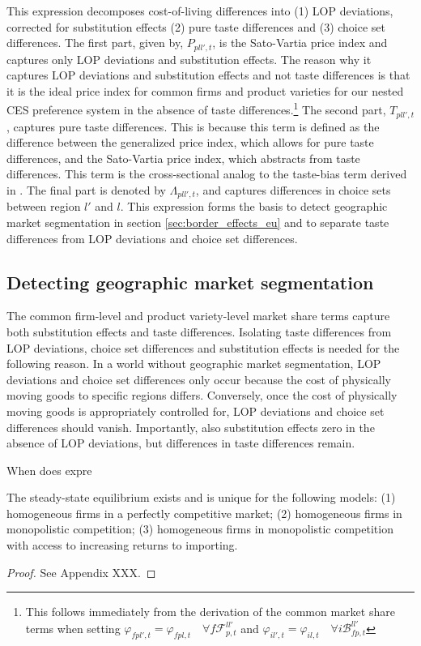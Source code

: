 This expression decomposes cost-of-living differences into (1) LOP deviations, corrected for substitution effects (2) pure taste differences and (3) choice set differences. The first part, given by, $P_{pll',t}$, is the Sato-Vartia price index and captures only LOP deviations and substitution effects. The reason why it captures LOP deviations and substitution effects and not taste differences is that it is the ideal price index for common firms and product varieties for our nested CES preference system in the absence of taste differences.\footnote{This follows immediately from the derivation of the common market share terms when setting $\varphi_{fpl',t} = \varphi_{fpl,t} \quad \forall f \mathcal{F}^{ll'}_{p,t}$ and $\varphi_{il',t} = \varphi_{il,t} \quad \forall i \mathcal{B}^{ll'}_{fp,t}$} The second part, $T_{pll',t}$, captures pure taste differences. This is because this term is defined as the difference between the generalized price index, which allows for pure taste differences, and the Sato-Vartia price index, which abstracts from taste differences. This term is the cross-sectional analog to the taste-bias term derived in \citet{Redding2020}. The final part is denoted by $\Lambda_{pll',t}$, and captures differences in choice sets between region $l'$ and $l$. This expression forms the basis to detect geographic market segmentation in section \ref{sec:border_effects_eu} and to separate taste differences from LOP deviations and choice set differences.

\subsection{Detecting geographic market segmentation}

The common firm-level and product variety-level market share terms capture both substitution effects and taste differences. Isolating taste differences from LOP deviations, choice set differences and substitution effects is needed for the following reason. In a world without geographic market segmentation, LOP deviations and choice set differences only occur because the cost of physically moving goods to specific regions differs. Conversely, once the cost of physically moving goods is appropriately controlled for, LOP deviations and choice set differences should vanish. Importantly, also substitution effects zero in the absence of LOP deviations, but differences in taste differences remain. 

When does expre

\begin{proposition}[Sufficieny ]\label{prop: Eta}
    The steady-state equilibrium exists and is unique for the following models: (1) homogeneous firms in a perfectly competitive market; (2) homogeneous firms in monopolistic competition; (3) homogeneous firms in monopolistic competition with access to increasing returns to importing. 
\end{proposition} 
\begin{proof}
    See Appendix XXX.
\end{proof}